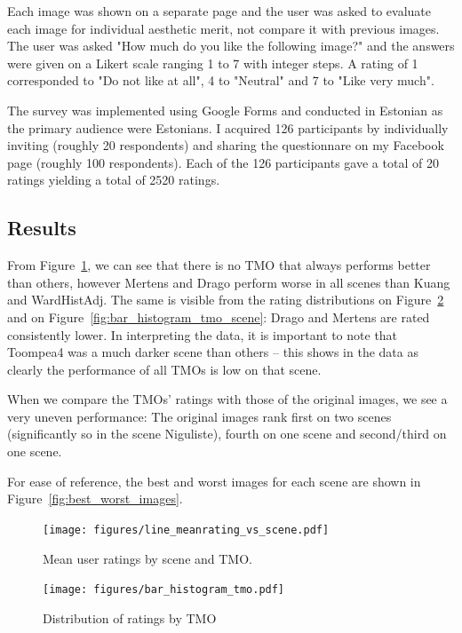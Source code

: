 \documentclass[a4paper]{scrartcl}
\begin{document}
Each image was shown on a separate page and the user was asked to evaluate each image for individual aesthetic merit, not compare it with previous images. The user was asked "How much do you like the following image?" and the answers were given on a Likert scale ranging 1 to 7 with integer steps. A rating of 1 corresponded to "Do not like at all", 4 to "Neutral" and 7 to "Like very much".

The survey was implemented using Google Forms and conducted in Estonian as the primary audience were Estonians. I acquired 126 participants by individually inviting (roughly 20 respondents) and sharing the questionnare on my Facebook page (roughly 100 respondents). Each of the 126 participants gave a total of 20 ratings yielding a total of 2520 ratings. 

\subsection{Results}

From Figure~\ref{fig:line_meanrating_vs_scene}, we can see that there is no TMO that always performs better than others, however Mertens and Drago perform worse in all scenes than Kuang and WardHistAdj. The same is visible from the rating distributions on Figure~\ref{fig:bar_histogram_tmo} and on Figure~\ref{fig:bar_histogram_tmo_scene}: Drago and Mertens are rated consistently lower. In interpreting the data, it is important to note that Toompea4 was a much darker scene than others -- this shows in the data as clearly the performance of all TMOs is low on that scene.

When we compare the TMOs' ratings with those of the original images, we see a very uneven performance: The original images rank first on two scenes (significantly so in the scene Niguliste), fourth on one scene and second/third on one scene.

For ease of reference, the best and worst images for each scene are shown in Figure~\ref{fig:best_worst_images}.


\begin{figure}[h]
\centering
\texttt{[image: figures/line\_meanrating\_vs\_scene.pdf]}
\caption{Mean user ratings by scene and TMO.}
\label{fig:line_meanrating_vs_scene}
\end{figure}

\begin{figure}[h]
\centering
\texttt{[image: figures/bar\_histogram\_tmo.pdf]}
\caption{Distribution of ratings by TMO}
\label{fig:bar_histogram_tmo}
\end{figure}
\end{document}
